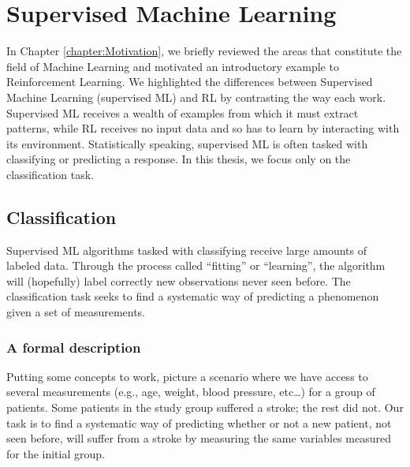 \chapter{Supervised Machine Learning}
\label{chapter:SupervisedLearning}

In Chapter \ref{chapter:Motivation}, we briefly reviewed the areas that
constitute the field of Machine Learning and motivated an introductory example
to Reinforcement Learning. We highlighted the differences between Supervised
Machine Learning (supervised ML) and RL by contrasting the way each work.
Supervised ML receives a wealth of examples from which it must extract patterns,
while RL receives no input data and so has to learn by interacting with its
environment. Statistically speaking, supervised ML is often tasked with classifying or predicting a
response. In this thesis, we focus only on the classification task.

\section{Classification}

Supervised ML algorithms tasked with classifying receive large amounts of
labeled data. Through the process called ``fitting'' or ``learning'', the
algorithm will (hopefully) label correctly new observations never seen before.
The classification task seeks to find a systematic way of predicting a
phenomenon given a set of measurements.

\subsection{A formal description} \label{sss:formalizing-trees}

Putting some concepts to work, picture a scenario where we have access to
several measurements (e.g., age, weight, blood pressure, etc\dots) for a group
of patients. Some patients in the study group suffered a stroke; the rest did
not. Our task is to find a systematic way of predicting whether or not a new
patient, not seen before, will suffer from a stroke by measuring the same
variables measured for the initial group.

